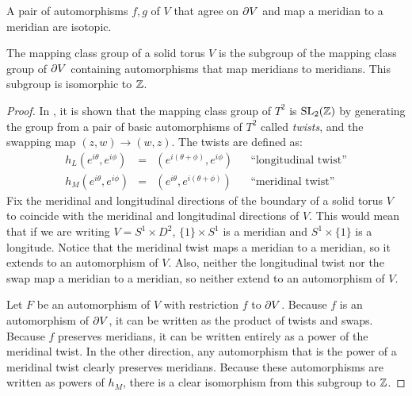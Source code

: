 \begin{lem}
	A pair of automorphisms $f,g$ of $V$ that agree on $\partial V$ and map a meridian to a meridian are isotopic.	
\end{lem}

\begin{theorem}
	\label{thm:mpgV}
	The mapping class group of a solid torus $V$ is the subgroup of the mapping class group of $\partial V$ containing automorphisms that map meridians to meridians.
	This subgroup is isomorphic to $\mathbb{Z}$.	
\end{theorem}

\begin{proof}
	In \cite{Rolf76}, it is shown that the mapping class group of $T^2$ is $\textrm{SL}_2(\mathbb{Z})$ by generating the group from a pair of basic automorphisms of $T^2$ called \emph{twists}, and the swapping map $(z,w)\to(w,z)$.
	The twists are defined as:
	\[
	\begin{array}{ccccc}
	h_L(e^{i\theta},e^{i\phi}) & = & (e^{i(\theta+\phi)},e^{i\phi}) & & \textrm{``longitudinal twist''} \\
	
	h_M(e^{i\theta},e^{i\phi}) & = & (e^{i\theta},e^{i(\theta+\phi)}) & & \textrm{``meridinal twist''}	
	\end{array}
	\]
	Fix the meridinal and longitudinal directions of the boundary of a solid torus $V$ to coincide with the meridinal and longitudinal directions of $V$.
	This would mean that if we are writing $V=S^1\times D^2$, $\{1\}\times S^1$ is a meridian and $S^1\times\{1\}$ is a longitude.
	Notice that the meridinal twist maps a meridian to a meridian, so it extends to an automorphism of $V$.
	Also, neither the longitudinal twist nor the swap map a meridian to a meridian, so neither extend to an automorphism of $V$.
	
	Let $F$ be an automorphism of $V$ with restriction $f$ to $\partial V$.
	Because $f$ is an automorphism of $\partial V$, it can be written as the product of twists and swaps.
	Because $f$ preserves meridians, it can be written entirely as a power of the meridinal twist.
	In the other direction, any automorphism that is the power of a meridinal twist clearly preserves meridians.
	Because these automorphisms are written as powers of $h_M$, there is a clear isomorphism from this subgroup to $\mathbb{Z}$.
\end{proof}

